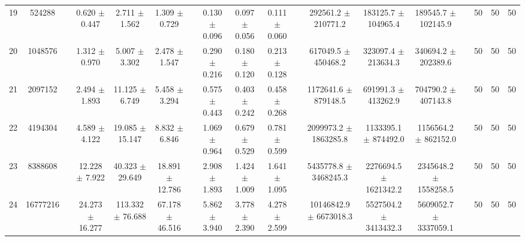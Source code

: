 \documentclass[11pt]{article}
\begin{document}
\begin{landscape}
\begin{table}
\begin{tabular}{cccccccccccccccccc}
19 &  524288 &&  0.620 $\pm$ 0.447 & 2.711 $\pm$ 1.562 & 1.309 $\pm$ 0.729 &&  0.130 $\pm$ 0.096 & 0.097 $\pm$ 0.056 & 0.111 $\pm$ 0.060 &&  292561.2 $\pm$ 210771.2 & 183125.7 $\pm$ 104965.4 & 189545.7 $\pm$ 102145.9 && 50& 50& 50\\
20 & 1048576 &&  1.312 $\pm$ 0.970 & 5.007 $\pm$ 3.302 & 2.478 $\pm$ 1.547 &&  0.290 $\pm$ 0.216 & 0.180 $\pm$ 0.120 & 0.213 $\pm$ 0.128 &&  617049.5 $\pm$ 450468.2 & 323097.4 $\pm$ 213634.3 & 340694.2 $\pm$ 202389.6 && 50& 50& 50\\
21 & 2097152 &&  2.494 $\pm$ 1.893 & 11.125 $\pm$ 6.749 & 5.458 $\pm$ 3.294 &&  0.575 $\pm$ 0.443 & 0.403 $\pm$ 0.242 & 0.458 $\pm$ 0.268 &&  1172641.6 $\pm$ 879148.5 & 691991.3 $\pm$ 413262.9 & 704790.2 $\pm$ 407143.8 && 50& 50& 50\\
22 & 4194304 &&  4.589 $\pm$ 4.122 & 19.085 $\pm$ 15.147 & 8.832 $\pm$ 6.846 &&  1.069 $\pm$ 0.964 & 0.679 $\pm$ 0.529 & 0.781 $\pm$ 0.599 &&  2099973.2 $\pm$ 1863285.8 & 1133395.1 $\pm$ 874492.0 & 1156564.2 $\pm$ 862152.0 && 50& 50& 50\\
23 & 8388608 &&  12.228 $\pm$ 7.922 & 40.323 $\pm$ 29.649 & 18.891 $\pm$ 12.786 &&  2.908 $\pm$ 1.893 & 1.424 $\pm$ 1.009 & 1.641 $\pm$ 1.095 &&  5435778.8 $\pm$ 3468245.3 & 2276694.5 $\pm$ 1621342.2 & 2345648.2 $\pm$ 1558258.5 && 50& 50& 50\\
24 & 16777216 &&  24.273 $\pm$ 16.277 & 113.332 $\pm$ 76.688 & 67.178 $\pm$ 46.516 &&  5.862 $\pm$ 3.940 & 3.778 $\pm$ 2.390 & 4.278 $\pm$ 2.599 &&  10146842.9 $\pm$ 6673018.3 & 5527504.2 $\pm$ 3413432.3 & 5609052.7 $\pm$ 3337059.1 && 50& 50& 50\\




\end{tabular}
\end{table}
\end{landscape}
\end{document}
